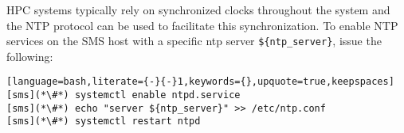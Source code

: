HPC systems typically rely on synchronized clocks throughout the system and the
NTP protocol can be used to facilitate this synchronization. To enable NTP
services on the SMS host with a specific ntp server \texttt{\$\{ntp\_server\}},
issue the following:

\begin{lstlisting}[language=bash,literate={-}{-}1,keywords={},upquote=true,keepspaces]
[sms](*\#*) systemctl enable ntpd.service
[sms](*\#*) echo "server ${ntp_server}" >> /etc/ntp.conf
[sms](*\#*) systemctl restart ntpd
\end{lstlisting}
